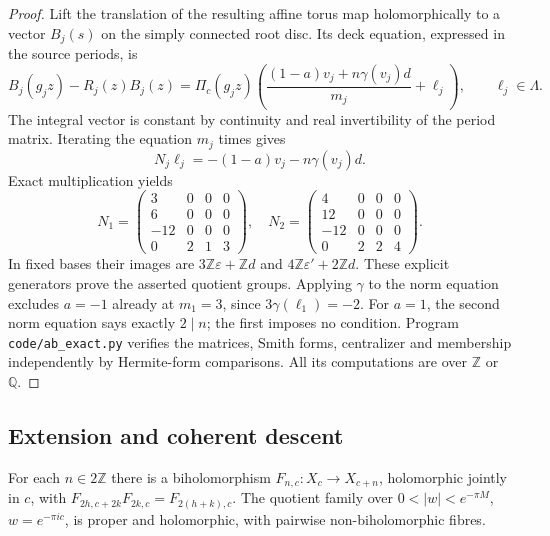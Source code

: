 \begin{proof}
Lift the translation of the resulting affine torus map holomorphically to a vector $B_j(s)$ on the simply connected root disc. Its deck equation, expressed in the source periods, is
\[
 B_j(g_jz)-R_j(z)B_j(z)=\Pi_c(g_jz)
 \left(\frac{(1-a)v_j+n\gamma(v_j)d}{m_j}+\ell_j\right),\qquad\ell_j\in\Lambda.
\]
The integral vector is constant by continuity and real invertibility of the period matrix. Iterating the equation $m_j$ times gives
\[
 N_j\ell_j=-(1-a)v_j-n\gamma(v_j)d.
\]
Exact multiplication yields
\[
 N_1=\begin{pmatrix}3&0&0&0\\6&0&0&0\\-12&0&0&0\\0&2&1&3\end{pmatrix},\quad
 N_2=\begin{pmatrix}4&0&0&0\\12&0&0&0\\-12&0&0&0\\0&2&2&4\end{pmatrix}.
\]
In fixed bases their images are $3\mathbb Z\varepsilon+\mathbb Zd$ and $4\mathbb Z\varepsilon'+2\mathbb Zd$. These explicit generators prove the asserted quotient groups. Applying $\gamma$ to the norm equation excludes $a=-1$ already at $m_1=3$, since $3\gamma(\ell_1)=-2$. For $a=1$, the second norm equation says exactly $2\mid n$; the first imposes no condition. Program \texttt{code/ab\_exact.py} verifies the matrices, Smith forms, centralizer and membership independently by Hermite-form comparisons. All its computations are over $\mathbb Z$ or $\mathbb Q$.
\end{proof}

\subsection{Extension and coherent descent}\label{fam:section:A.3}

\begin{proposition}\label{fam:src:A.3.1}\label{fam:st:A.3.1}
For each $n\in2\mathbb Z$ there is a biholomorphism $F_{n,c}:X_c\to X_{c+n}$, holomorphic jointly in $c$, with $F_{2h,c+2k}F_{2k,c}=F_{2(h+k),c}$. The quotient family over $0<|w|<e^{-\pi M}$, $w=e^{-\pi ic}$, is proper and holomorphic, with pairwise non-biholomorphic fibres.
\end{proposition}

